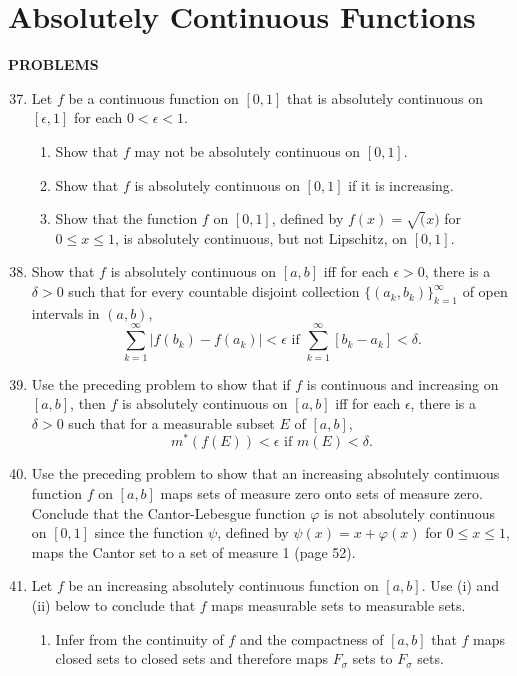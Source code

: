 \section{Absolutely Continuous Functions}
\begin{center}
	\textbf{PROBLEMS}
\end{center}
\begin{enumerate}
	\setcounter{enumi}{36}
    \item Let $f$ be a continuous function on $[0,1]$ that is absolutely continuous on $[\epsilon,1]$ for each $0<\epsilon<1$.
    \begin{enumerate}[label=(\roman*),align=left]
        \item Show that $f$ may not be absolutely continuous on $[0,1]$.
        \item Show that $f$ is absolutely continuous on $[0,1]$ if it is increasing.
        \item Show that the function $f$ on $[0,1]$, defined by $f(x)=\sqrt(x)$ for $0\le x\le1$, is absolutely continuous, but not Lipschitz, on $[0,1]$.
    \end{enumerate}
    \item Show that $f$ is absolutely continuous on $[a,b]$ iff for each $\epsilon>0$, there is a $\delta>0$ such that for every countable disjoint collection $\{(a_k,b_k)\}_{k=1}^\infty$ of open intervals in $(a,b)$,
    \[
        \sum_{k=1}^\infty|f(b_k)-f(a_k)|<\epsilon\text{ if }\sum_{k=1}^\infty[b_k-a_k]<\delta.  
    \]
    \item Use the preceding problem to show that if $f$ is continuous and increasing on $[a,b]$, then $f$ is absolutely continuous on $[a,b]$ iff for each $\epsilon$, there is a $\delta>0$ such that for a measurable subset $E$ of $[a,b]$,
    \[
        m^*(f(E))<\epsilon\text{ if }m(E)<\delta.  
    \]
    \item Use the preceding problem to show that an increasing absolutely continuous function $f$ on $[a,b]$ maps sets of measure zero onto sets of measure zero.
    Conclude that the Cantor-Lebesgue function $\varphi$ is not absolutely continuous on $[0,1]$ since the function $\psi$, defined by $\psi(x)=x+\varphi(x)$ for $0\le x\le1$, maps the Cantor set to a set of measure 1 (page 52).
    \item Let $f$ be an increasing absolutely continuous function on $[a,b]$. Use (i) and (ii) below to conclude that $f$ maps measurable sets to measurable sets.
    \begin{enumerate}[label=(\roman*),align=left]
        \item Infer from the continuity of $f$ and the compactness of $[a,b]$ that $f$ maps closed sets to closed sets and therefore maps $F_\sigma$ sets to $F_\sigma$ sets.

\end{enumerate}
\end{enumerate}
